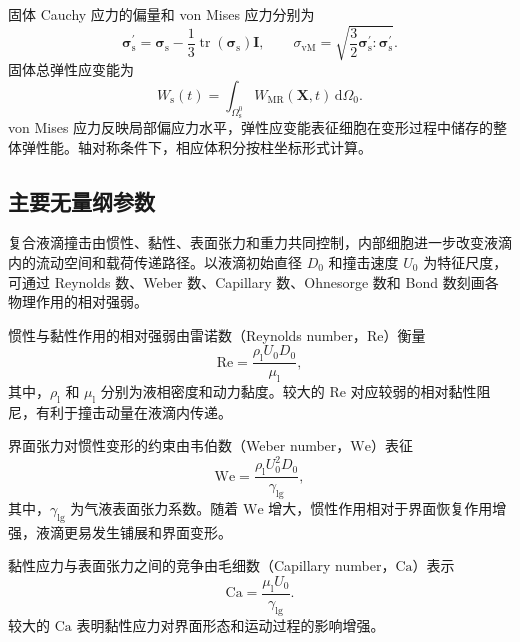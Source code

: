 固体 Cauchy 应力的偏量和 von Mises 应力分别为
\begin{equation}
\boldsymbol{\sigma}_{\mathrm s}^{\prime}
=
\boldsymbol{\sigma}_{\mathrm s}
-
\frac{1}{3}
\operatorname{tr}\left(\boldsymbol{\sigma}_{\mathrm s}\right)
\boldsymbol{I},
\qquad
\sigma_{\mathrm{vM}}
=
\sqrt{
\frac{3}{2}
\boldsymbol{\sigma}_{\mathrm s}^{\prime}:
\boldsymbol{\sigma}_{\mathrm s}^{\prime}}
.
\label{eq:ch2_von_mises}
\end{equation}
固体总弹性应变能为
\begin{equation}
W_{\mathrm s}(t)
=
\int_{\Omega_{\mathrm s}^0}
W_{\mathrm{MR}}(\boldsymbol{X},t)
\,\mathrm d\Omega_0.
\label{eq:ch2_total_strain_energy}
\end{equation}
von Mises 应力反映局部偏应力水平，弹性应变能表征细胞在变形过程中储存的整体弹性能。轴对称条件下，相应体积分按柱坐标形式计算。

\subsection{主要无量纲参数}
\label{subsec:ch2_dimensionless}

复合液滴撞击由惯性、黏性、表面张力和重力共同控制，内部细胞进一步改变液滴内的流动空间和载荷传递路径。以液滴初始直径 $D_0$ 和撞击速度 $U_0$ 为特征尺度，可通过 Reynolds 数、Weber 数、Capillary 数、Ohnesorge 数和 Bond 数刻画各物理作用的相对强弱。

惯性与黏性作用的相对强弱由雷诺数（Reynolds number，$\mathrm{Re}$）衡量
\begin{equation}
\mathrm{Re}
=
\frac{\rho_{\mathrm l}U_0D_0}{\mu_{\mathrm l}},
\label{eq:ch2_re}
\end{equation}
其中，$\rho_{\mathrm l}$ 和 $\mu_{\mathrm l}$ 分别为液相密度和动力黏度。较大的 $\mathrm{Re}$ 对应较弱的相对黏性阻尼，有利于撞击动量在液滴内传递。

界面张力对惯性变形的约束由韦伯数（Weber number，$\mathrm{We}$）表征
\begin{equation}
\mathrm{We}
=
\frac{\rho_{\mathrm l}U_0^2D_0}{\gamma_{\mathrm{lg}}},
\label{eq:ch2_we}
\end{equation}
其中，$\gamma_{\mathrm{lg}}$ 为气液表面张力系数。随着 $\mathrm{We}$ 增大，惯性作用相对于界面恢复作用增强，液滴更易发生铺展和界面变形。

黏性应力与表面张力之间的竞争由毛细数（Capillary number，$\mathrm{Ca}$）表示
\begin{equation}
\mathrm{Ca}
=
\frac{\mu_{\mathrm l}U_0}{\gamma_{\mathrm{lg}}}.
\label{eq:ch2_ca}
\end{equation}
较大的 $\mathrm{Ca}$ 表明黏性应力对界面形态和运动过程的影响增强。

